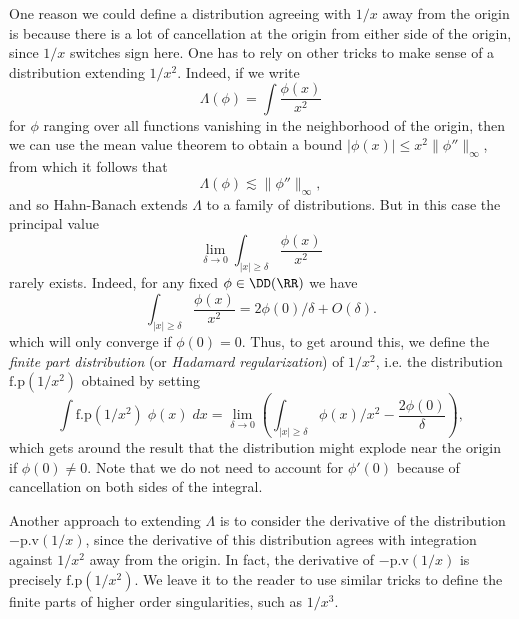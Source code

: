\begin{example}
    One reason we could define a distribution agreeing with $1/x$ away from the origin is because there is a lot of cancellation at the origin from either side of the origin, since $1/x$ switches sign here. One has to rely on other tricks to make sense of a distribution extending $1/x^2$. Indeed, if we write
    \[ \Lambda(\phi) = \int \frac{\phi(x)}{x^2} \]
    for $\phi$ ranging over all functions vanishing in the neighborhood of the origin, then we can use the mean value theorem to obtain a bound $|\phi(x)| \leq x^2 \| \phi'' \|_\infty$, from which it follows that
    \[ \Lambda(\phi) \lesssim \| \phi'' \|_\infty, \]
    and so Hahn-Banach extends $\Lambda$ to a family of distributions. But in this case the principal value
    \[ \lim_{\delta \to 0} \int_{|x| \geq \delta} \frac{\phi(x)}{x^2} \]
    rarely exists. Indeed, for any fixed $\phi \in \DD(\RR)$ we have
    \[ \int_{|x| \geq \delta} \frac{\phi(x)}{x^2} = 2 \phi(0) / \delta + O(\delta). \]
    which will only converge if $\phi(0) = 0$. Thus, to get around this, we define the \emph{finite part distribution} (or \emph{Hadamard regularization}) of $1/x^2$, i.e. the distribution $\text{f.p}(1/x^2)$ obtained by setting
    \[ \int \text{f.p}(1/x^2)\; \phi(x)\; dx = \lim_{\delta \to 0} \left( \int_{|x| \geq \delta} \phi(x)/x^2 - \frac{2 \phi(0)}{\delta} \right), \]
    which gets around the result that the distribution might explode near the origin if $\phi(0) \neq 0$. Note that we do not need to account for $\phi'(0)$ because of cancellation on both sides of the integral.

    Another approach to extending $\Lambda$ is to consider the derivative of the distribution $- \text{p.v}(1/x)$, since the derivative of this distribution agrees with integration against $1/x^2$ away from the origin. In fact, the derivative of $- \text{p.v}(1/x)$ is precisely $\text{f.p}(1/x^2)$. We leave it to the reader to use similar tricks to define the finite parts of higher order singularities, such as $1/x^3$.
\end{example}

